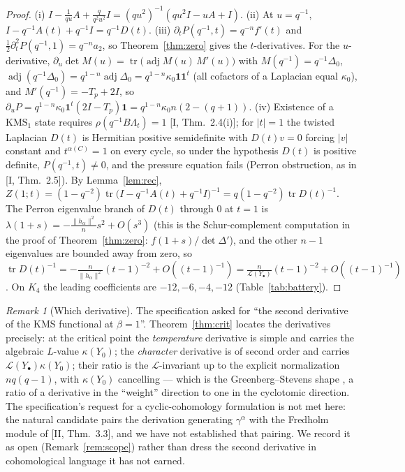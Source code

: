 \documentclass[11pt]{amsart}
\numberwithin{equation}{section}
\theoremstyle{definition}
\theoremstyle{remark}
\newtheorem{remark}[theorem]{Remark}
\newcommand{\La}{\Lambda}
\newcommand{\cL}{\mathcal{L}}
\newcommand{\tr}{\operatorname{tr}}
\newcommand{\adj}{\operatorname{adj}}
\newcommand{\KMS}{\mathrm{KMS}}
\begin{document}
\begin{proof}
(i) $I-\frac1{qu}A+\frac{q}{q^{2}u^{2}}I=(qu^{2})^{-1}(qu^{2}I-uA+I)$. (ii) At $u=q^{-1}$,
$I-q^{-1}A(t)+q^{-1}I=q^{-1}D(t)$. (iii) $\partial_tP(q^{-1},t)=q^{-n}f'(t)$ and
$\frac12\partial_t^{2}P(q^{-1},1)=q^{-n}a_2$, so Theorem~\ref{thm:zero} gives the
$t$-derivatives. For the $u$-derivative, $\partial_u\det M(u)=\tr\bigl(\adj M(u)\,M'(u)\bigr)$
with $M(q^{-1})=q^{-1}\Delta_0$, $\adj(q^{-1}\Delta_0)=q^{1-n}\adj\Delta_0
=q^{1-n}\kappa_0\mathbf1\mathbf1^{t}$ (all cofactors of a Laplacian equal $\kappa_0$),
and $M'(q^{-1})=-T_p+2I$, so $\partial_uP=q^{1-n}\kappa_0\mathbf1^{t}(2I-T_p)\mathbf1
=q^{1-n}\kappa_0n(2-(q{+}1))$. (iv) Existence of a $\KMS_1$ state requires
$\rho(q^{-1}B\La_t)=1$ [I, Thm.~2.4(i)]; for $|t|=1$ the twisted Laplacian $D(t)$ is
Hermitian positive semidefinite with $D(t)v=0$ forcing $|v|$ constant and
$t^{\alpha(C)}=1$ on every cycle, so under the hypothesis $D(t)$ is positive definite,
$P(q^{-1},t)\neq0$, and the pressure equation fails (Perron obstruction, as in
[I, Thm.~2.5]). By Lemma~\ref{lem:rec},
$Z(1;t)=(1-q^{-2})\tr\bigl(I-q^{-1}A(t)+q^{-1}I\bigr)^{-1}=q(1-q^{-2})\tr D(t)^{-1}$.
The Perron eigenvalue branch of $D(t)$ through $0$ at $t=1$ is
$\lambda(1+s)=-\frac{\|h_\alpha\|^{2}}{n}s^{2}+O(s^{3})$ (this is the Schur-complement
computation in the proof of Theorem~\ref{thm:zero}: $f(1+s)/\det\Delta'$), and the other
$n-1$ eigenvalues are bounded away from zero, so $\tr D(t)^{-1}=
-\frac{n}{\|h_\alpha\|^{2}}(t-1)^{-2}+O((t-1)^{-1})=\frac{n}{\cL(Y_\bullet)}(t-1)^{-2}
+O((t-1)^{-1})$. On $K_4$ the leading coefficients are $-12,-6,-4,-12$
(Table~\ref{tab:battery}).
\end{proof}

\begin{remark}[Which derivative]\label{rem:whichderivative}
The specification asked for ``the second derivative of the KMS functional at $\beta=1$''.
Theorem~\ref{thm:crit} locates the derivatives precisely: at the critical point the
\emph{temperature} derivative is simple and carries the algebraic $L$-value
$\kappa(Y_0)$; the \emph{character} derivative is of second order and carries
$\cL(Y_\bullet)\kappa(Y_0)$; their ratio is the $\cL$-invariant up to the explicit
normalization $nq(q-1)$, with $\kappa(Y_0)$ cancelling --- which is the Greenberg--Stevens
shape \cite{GS}, a ratio of a derivative in the ``weight'' direction to one in the
cyclotomic direction. The specification's request for a cyclic-cohomology formulation
is not met here: the natural candidate pairs the derivation generating $\gamma^{\alpha}$
with the Fredholm module of [II, Thm.~3.3], and we have not established that pairing.
We record it as open (Remark~\ref{rem:scope}) rather than dress the second derivative in
cohomological language it has not earned.
\end{remark}
\end{document}
